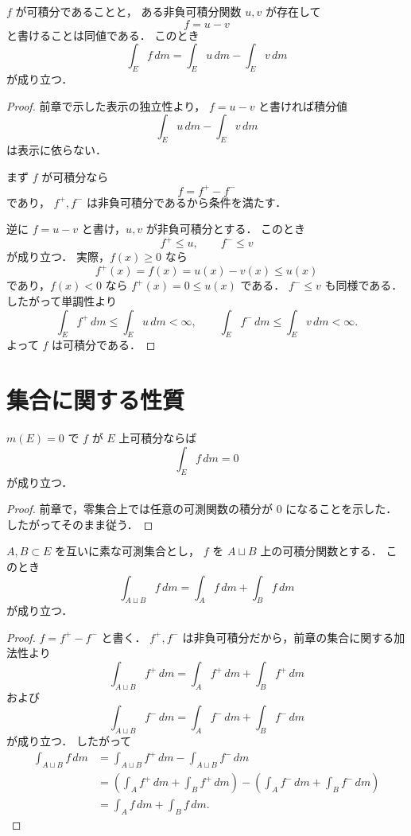 \begin{proposition}[非負関数による表示]
$f$ が可積分であることと，
ある非負可積分関数 $u,v$ が存在して
\[
f=u-v
\]
と書けることは同値である．
このとき
\[
\int_E f\,dm=\int_E u\,dm-\int_E v\,dm
\]
が成り立つ．
\end{proposition}
\begin{proof}
前章で示した表示の独立性より，
$f=u-v$ と書ければ積分値
\[
\int_E u\,dm-\int_E v\,dm
\]
は表示に依らない．

まず $f$ が可積分なら
\[
f=f^+-f^-
\]
であり，
$f^+,f^-$ は非負可積分であるから条件を満たす．

逆に $f=u-v$ と書け，$u,v$ が非負可積分とする．
このとき
\[
f^+\le u,\qquad f^-\le v
\]
が成り立つ．
実際，$f(x)\ge 0$ なら
\[
f^+(x)=f(x)=u(x)-v(x)\le u(x)
\]
であり，$f(x)<0$ なら $f^+(x)=0\le u(x)$ である．
$f^-\le v$ も同様である．
したがって単調性より
\[
\int_E f^+\,dm\le \int_E u\,dm<\infty,
\qquad
\int_E f^-\,dm\le \int_E v\,dm<\infty.
\]
よって $f$ は可積分である．
\end{proof}

\section{集合に関する性質}

\begin{proposition}[零集合上では積分は消える]
$m(E)=0$ で $f$ が $E$ 上可積分ならば
\[
\int_E f\,dm=0
\]
が成り立つ．
\end{proposition}
\begin{proof}
前章で，零集合上では任意の可測関数の積分が $0$ になることを示した．
したがってそのまま従う．
\end{proof}

\begin{proposition}[互いに素な集合への加法性]
$A,B \subset E$ を互いに素な可測集合とし，
$f$ を $A\sqcup B$ 上の可積分関数とする．
このとき
\[
\int_{A \sqcup B} f\,dm
=
\int_A f\,dm+\int_B f\,dm
\]
が成り立つ．
\end{proposition}
\begin{proof}
$f=f^+-f^-$ と書く．
$f^+,f^-$ は非負可積分だから，前章の集合に関する加法性より
\[
\int_{A \sqcup B} f^+\,dm
=
\int_A f^+\,dm+\int_B f^+\,dm
\]
および
\[
\int_{A \sqcup B} f^-\,dm
=
\int_A f^-\,dm+\int_B f^-\,dm
\]
が成り立つ．
したがって
\begin{align*}
\int_{A \sqcup B} f\,dm
&=
\int_{A \sqcup B} f^+\,dm-\int_{A \sqcup B} f^-\,dm \\
&=
\left(\int_A f^+\,dm+\int_B f^+\,dm\right)
-\left(\int_A f^-\,dm+\int_B f^-\,dm\right) \\
&=
\int_A f\,dm+\int_B f\,dm.
\end{align*}
\end{proof}

